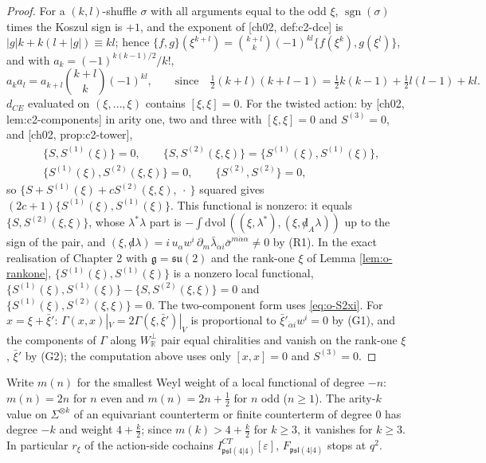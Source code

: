 \begin{proof}
For a $(k,l)$-shuffle $\sigma$ with all arguments equal to the odd $\xi$, $\operatorname{sgn}(\sigma)$ times the Koszul sign is $+1$, and the exponent of [ch02, def:c2-dce] is $|g|k+k(l+|g|)\equiv kl$; hence $\{f,g\}(\xi^{k+l})=\binom{k+l}{k}(-1)^{kl}\{f(\xi^k),g(\xi^l)\}$, and with $a_k=(-1)^{k(k-1)/2}/k!$,
\[
a_ka_l=a_{k+l}\binom{k+l}{k}(-1)^{kl},\qquad\text{since}\quad \tfrac12(k+l)(k+l-1)=\tfrac12k(k-1)+\tfrac12l(l-1)+kl .
\]
$d_{CE}$ evaluated on $(\xi,\dots,\xi)$ contains $[\xi,\xi]=0$. For the twisted action: by [ch02, lem:c2-components] in arity one, two and three with $[\xi,\xi]=0$ and $S^{(3)}=0$, and [ch02, prop:c2-tower],
\[
\begin{aligned}
&\{S,S^{(1)}(\xi)\}=0,\qquad \{S,S^{(2)}(\xi,\xi)\}=\{S^{(1)}(\xi),S^{(1)}(\xi)\},\\
&\{S^{(1)}(\xi),S^{(2)}(\xi,\xi)\}=0,\qquad \{S^{(2)},S^{(2)}\}=0,
\end{aligned}
\]
so $\{S+S^{(1)}(\xi)+cS^{(2)}(\xi,\xi),\ \cdot\ \}$ squared gives $(2c+1)\{S^{(1)}(\xi),S^{(1)}(\xi)\}$. This functional is nonzero: it equals $\{S,S^{(2)}(\xi,\xi)\}$, whose $\lambda^*\lambda$ part is $-\int\mathrm{dvol}\,((\xi,\lambda^*),(\xi,{\not d}_A\lambda))$ up to the sign of the pair, and $(\xi,{\not d}\lambda)=i\,u_\alpha w^i\,\partial_m\bar\lambda_{\dot\alpha i}\bar\sigma^{m\dot\alpha\alpha}\neq0$ by (R1). In the exact realisation of Chapter 2 with $\mathfrak g=\mathfrak{su}(2)$ and the rank-one $\xi$ of Lemma \ref{lem:o-rankone}, $\{S^{(1)}(\xi),S^{(1)}(\xi)\}$ is a nonzero local functional, $\{S^{(1)}(\xi),S^{(1)}(\xi)\}-\{S,S^{(2)}(\xi,\xi)\}=0$ and $\{S^{(1)}(\xi),S^{(2)}(\xi,\xi)\}=0$. The two-component form uses \eqref{eq:o-S2xi}. For $x=\xi+\bar\xi'$: $\Gamma(x,x)|_V=2\Gamma(\xi,\bar\xi')|_V$ is proportional to $\bar\xi'_{\dot\alpha i}w^i=0$ by (G1), and the components of $\Gamma$ along $W_{\mathbb R}^\perp$ pair equal chiralities and vanish on the rank-one $\xi$, $\bar\xi'$ by (G2); the computation above uses only $[x,x]=0$ and $S^{(3)}=0$.
\end{proof}

\begin{lemma}
\label{lem:o-actiontrunc}
Write $m(n)$ for the smallest Weyl weight of a local functional of degree $-n$: $m(n)=2n$ for $n$ even and $m(n)=2n+\tfrac12$ for $n$ odd ($n\ge1$). The arity-$k$ value on $\Sigma^{\otimes k}$ of an equivariant counterterm or finite counterterm of degree $0$ has degree $-k$ and weight $4+\tfrac k2$; since $m(k)>4+\tfrac k2$ for $k\ge3$, it vanishes for $k\ge3$. In particular $r_\xi$ of the action-side cochains $I^{CT}_{\mathfrak{psl}(4|4)}[\varepsilon]$, $F_{\mathfrak{psl}(4|4)}$ stops at $q^2$.
\end{lemma}

